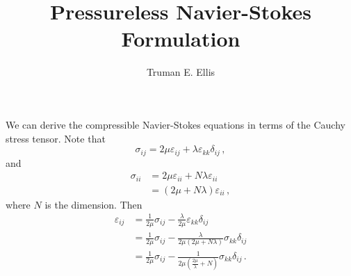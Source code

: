 \documentclass{article}
\author{Truman E. Ellis}
\title{Pressureless Navier-Stokes Formulation}
\begin{document}
\maketitle

We can derive the compressible Navier-Stokes equations in terms of the Cauchy stress tensor.
Note that
\begin{equation*}
  \sigma_{ij}=2\mu\varepsilon_{ij}+\lambda\varepsilon_{kk}\delta_{ij}\,,
\end{equation*}
and
\begin{align*}
  \sigma_{ii}&=2\mu\varepsilon_{ii}+N\lambda\varepsilon_{ii}\\
  &=(2\mu+N\lambda)\varepsilon_{ii}\,,
\end{align*}
where $N$ is the dimension.
Then
\begin{align*}
  \varepsilon_{ij}&=\frac{1}{2\mu}\sigma_{ij}-\frac{\lambda}{2\mu}\varepsilon_{kk}\delta_{ij}\\
  &=\frac{1}{2\mu}\sigma_{ij}-\frac{\lambda}{2\mu(2\mu+N\lambda)}\sigma_{kk}\delta_{ij}\\
  &=\frac{1}{2\mu}\sigma_{ij}-\frac{1}{2\mu(\frac{2\mu}{\lambda}+N)}\sigma_{kk}\delta_{ij}\,.
\end{align*}
\end{document}
